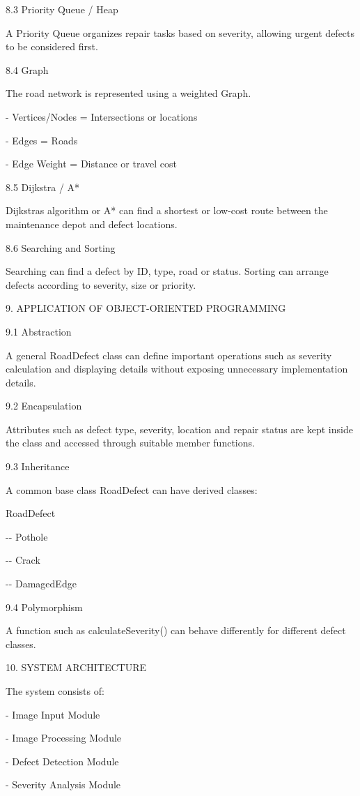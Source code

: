\documentclass[
]{article}
\begin{document}
8.3 Priority Queue / Heap

A Priority Queue organizes repair tasks based on severity, allowing
urgent defects to be considered first.

8.4 Graph

The road network is represented using a weighted Graph.

- Vertices/Nodes = Intersections or locations

- Edges = Roads

- Edge Weight = Distance or travel cost

8.5 Dijkstra / A*

Dijkstra\textquotesingle s algorithm or A* can find a shortest or
low-cost route between the maintenance depot and defect locations.

8.6 Searching and Sorting

Searching can find a defect by ID, type, road or status. Sorting can
arrange defects according to severity, size or priority.

9. APPLICATION OF OBJECT-ORIENTED PROGRAMMING

9.1 Abstraction

A general RoadDefect class can define important operations such as
severity calculation and displaying details without exposing unnecessary
implementation details.

9.2 Encapsulation

Attributes such as defect type, severity, location and repair status are
kept inside the class and accessed through suitable member functions.

9.3 Inheritance

A common base class RoadDefect can have derived classes:

RoadDefect

\textbar-\/- Pothole

\textbar-\/- Crack

\textbar-\/- DamagedEdge

9.4 Polymorphism

A function such as calculateSeverity() can behave differently for
different defect classes.

10. SYSTEM ARCHITECTURE

The system consists of:

- Image Input Module

- Image Processing Module

- Defect Detection Module

- Severity Analysis Module
\end{document}
